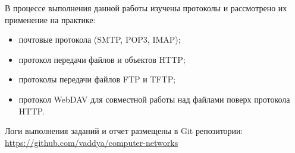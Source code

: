 В процессе выполнения данной работы изучены протоколы и рассмотрено их применение на практике:

\begin{itemize}
	\item почтовые протокола (SMTP, POP3, IMAP);
	\item протокол передачи файлов и объектов HTTP;
	\item протоколы передачи файлов FTP и TFTP;
	\item протокол WebDAV для совместной работы над файлами поверх протокола HTTP. 
\end{itemize}

Логи выполнения заданий и отчет размещены в Git репозитории:\\ 
\url{https://github.com/vaddya/computer-networks}


